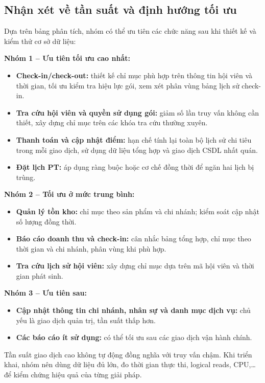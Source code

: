 \documentclass[11pt, a4paper]{article}
\begin{document}
\subsection{Nhận xét về tần suất và định hướng tối ưu}
Dựa trên bảng phân tích, nhóm có thể ưu tiên các chức năng sau khi thiết kế và kiểm thử cơ sở dữ liệu:

\textbf{Nhóm 1 -- Ưu tiên tối ưu cao nhất:}
\begin{itemize}
    \item \textbf{Check-in/check-out:} thiết kế chỉ mục phù hợp trên thông tin hội viên và thời gian, tối ưu kiểm tra hiệu lực gói, xem xét phân vùng bảng lịch sử check-in.
    \item \textbf{Tra cứu hội viên và quyền sử dụng gói:} giảm số lần truy vấn không cần thiết, xây dựng chỉ mục trên các khóa tra cứu thường xuyên.
    \item \textbf{Thanh toán và cập nhật điểm:} hạn chế tính lại toàn bộ lịch sử chi tiêu trong mỗi giao dịch, sử dụng dữ liệu tổng hợp và giao dịch CSDL nhất quán.
    \item \textbf{Đặt lịch PT:} áp dụng ràng buộc hoặc cơ chế đồng thời để ngăn hai lịch bị trùng.
\end{itemize}

\textbf{Nhóm 2 -- Tối ưu ở mức trung bình:}
\begin{itemize}
    \item \textbf{Quản lý tồn kho:} chỉ mục theo sản phẩm và chi nhánh; kiểm soát cập nhật số lượng đồng thời.
    \item \textbf{Báo cáo doanh thu và check-in:} cân nhắc bảng tổng hợp, chỉ mục theo thời gian và chi nhánh, phân vùng khi phù hợp.
    \item \textbf{Tra cứu lịch sử hội viên:} xây dựng chỉ mục dựa trên mã hội viên và thời gian phát sinh.
\end{itemize}

\textbf{Nhóm 3 -- Ưu tiên sau:}
\begin{itemize}
    \item \textbf{Cập nhật thông tin chi nhánh, nhân sự và danh mục dịch vụ:} chủ yếu là giao dịch quản trị, tần suất thấp hơn.
    \item \textbf{Các báo cáo ít sử dụng:} có thể tối ưu sau các giao dịch vận hành chính.
\end{itemize}

Tần suất giao dịch cao không tự động đồng nghĩa với truy vấn chậm. Khi triển khai, nhóm nên dùng dữ liệu đủ lớn, đo thời gian thực thi, logical reads, CPU,\dots để kiểm chứng hiệu quả của từng giải pháp.
\end{document}
